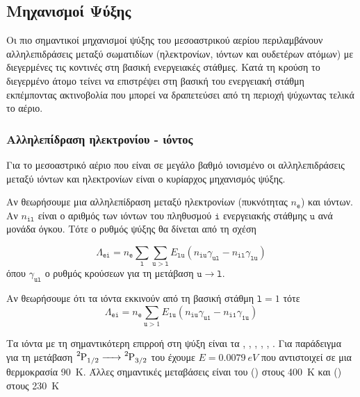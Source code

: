 % 
% 
 
\subsection{Μηχανισμοί Ψύξης}
Οι πιο σημαντικοί μηχανισμοί ψύξης του μεσοαστρικού αερίου περιλαμβάνουν αλληλεπιδράσεις μεταξύ σωματιδίων (ηλεκτρονίων, ιόντων και ουδετέρων ατόμων) με διεγερμένες τις κοντινές στη βασική ενεργειακές στάθμες. Κατά τη κρούση το διεγερμένο άτομο τείνει να επιστρέψει στη βασική του ενεργειακή στάθμη εκπέμποντας ακτινοβολία που μπορεί να δραπετεύσει από τη περιοχή ψύχωντας τελικά το αέριο. 

\subsubsection{Αλληλεπίδραση ηλεκτρονίου - ιόντος}
Για το μεσοαστρικό αέριο που είναι σε μεγάλο βαθμό ιονισμένο οι αλληλεπιδράσεις μεταξύ ιόντων και ηλεκτρονίων είναι ο κυρίαρχος μηχανισμός ψύξης.

Αν θεωρήσουμε μια αλληλεπίδραση μεταξύ ηλεκτρονίων (πυκνότητας $n_\mathtt{e}$) και ιόντων. Αν $n_\mathtt{il}$ είναι ο αριθμός των ιόντων του πληθυσμού $\mathtt{i}$ ενεργειακής στάθμης $\mathtt{u}$ ανά μονάδα όγκου. Τότε ο ρυθμός ψύξης θα δίνεται από τη σχέση


\begin{equation}
\Lambda _\mathtt{ei} = n_\mathtt{e} \sum_{\mathtt{l}} \sum_{\mathtt{u}>\mathtt{l}} E_\mathtt{lu} 
(n_\mathtt{iu} \gamma _\mathtt{ul} - n_\mathtt{il} \gamma _\mathtt{lu}) 
\end{equation}
όπου $\gamma _\mathtt{ul}$ ο ρυθμός κρούσεων για τη μετάβαση $\mathtt{u} \rightarrow \mathtt{l}$.

Αν θεωρήσουμε ότι τα ιόντα εκκινούν από τη βασική στάθμη $\mathtt{l}=1$ τότε  
\begin{equation}
\Lambda _\mathtt{ei} = n_\mathtt{e} \sum_{\mathtt{u}>1} E_\mathtt{1u} 
(n_\mathtt{iu} \gamma _\mathtt{u1} - n_\mathtt{i1} \gamma _\mathtt{1u}) 
\end{equation}

Τα ιόντα με τη σημαντικότερη επιρροή στη ψύξη είναι τα , , , , , . Για παράδειγμα για τη μετάβαση $\ce{^2P1/2 -> ^2P3/2}$ του  έχουμε $Ε=\SI{0.0079}{eV}$ που αντιστοιχεί σε μια θερμοκρασία \SI{90}{K}. Άλλες σημαντικές μεταβάσεις είναι του  () στους \SI{400}{K} και  () στους \SI{230}{K}


